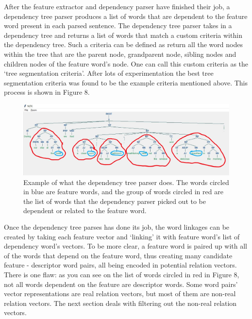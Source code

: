 \documentclass{sig-alternate}
\begin{document}
After the feature extractor and dependency parser have finished their job, a dependency tree parser produces a list of words that are dependent to the feature word present in each parsed sentence. The dependency tree parser takes in a dependency tree and returns a list of words that match a custom criteria within the dependency tree. Such a criteria can be defined as return all the word nodes within the tree that are the parent node, grandparent node, sibling nodes and children nodes of the feature word's node. One can call this custom criteria as the `tree segmentation criteria'. After lots of experimentation the best tree segmentation criteria was found to be the example criteria mentioned above. This process is shown in Figure 8. 

\begin{figure}
\centering
\includegraphics[scale=0.25]{images/dep_tree_parsing.JPG}
\caption{Example of what the dependency tree parser does. The words circled in blue are feature words, and the group of words circled in red are the list of words that the dependency parser picked out to be dependent or related to the feature word.}
\end{figure}

Once the dependency tree parses has done its job, the word linkages can be created by taking each feature vector and `linking' it with feature word's list of dependency word's vectors. To be more clear, a feature word is paired up with all of the words that depend on the feature word, thus creating many candidate feature - descriptor word pairs, all being encoded in potential relation vectors. There is one flaw: as you can see on the list of words circled in red in Figure 8, not all words dependent on the feature are descriptor words. Some word pairs' vector representations are real relation vectors, but most of them are non-real relation vectors. The next section deals with filtering out the non-real relation vectors.
\end{document}
